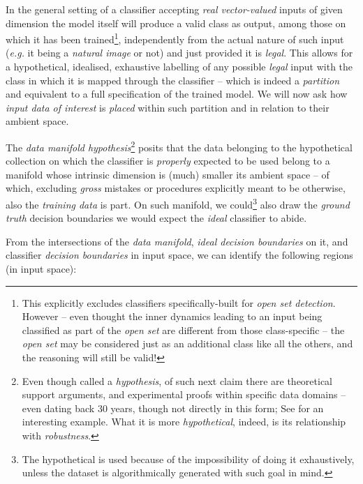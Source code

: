 In the general setting of a classifier accepting \textit{real vector-valued} inputs of given dimension the model itself will produce a valid class as output, among those on which it has been trained\footnote{This explicitly excludes classifiers specifically-built for \textit{open set detection}. However -- even thought the inner dynamics leading to an input being classified as part of the \textit{open set} are different from those class-specific -- the \textit{open set} may be considered just as an additional class like all the others, and the reasoning will still be valid!}, independently from the actual nature of such input (\textit{e.g.} it being a \textit{natural image} or not) and just provided it is \textit{legal}. This allows for a hypothetical, idealised, exhaustive labelling of any possible \textit{legal} input with the class in which it is mapped through the classifier -- which is indeed a \textit{partition} and equivalent to a full specification of the trained model. We will now ask how \textit{input data of interest} is \textit{placed} within such partition and in relation to their ambient space.

The \textit{data manifold hypothesis}\footnote{Even though called a \textit{hypothesis}, of such next claim there are theoretical support arguments, and experimental proofs within specific data domains -- even dating back 30 years, though not directly in this form; See \cite{Laughlin1994FlyEye} for an interesting example. What it is more \textit{hypothetical}, indeed, is its relationship with \textit{robustness}.} posits that the data belonging to the hypothetical collection on which the classifier is \textit{properly} expected to be used belong to a manifold whose intrinsic dimension is (much) smaller \wrt its ambient space -- of which, excluding \textit{gross} mistakes or procedures explicitly meant to be otherwise, also the \textit{training data} is part. On such manifold, we could\footnote{The hypothetical is used because of the impossibility of doing it exhaustively, unless the dataset is algorithmically generated with such goal in mind.} also draw the \textit{ground truth} decision boundaries we would expect the \textit{ideal} classifier to abide.

From the intersections of the \textit{data manifold}, \textit{ideal decision boundaries} on it, and classifier \textit{decision boundaries} in input space, we can identify the following regions (in input space):

